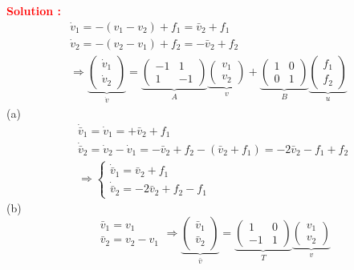 \documentclass[12pt]{article}
\begin{document}
\textbf{\textcolor{red}{Solution :}} \\
$$
\begin{aligned}
\dot{v}_1=-\left(v_1-v_2\right)+f_1=\bar{v}_2+f_1 \\
\dot{v}_2=-\left(v_2-v_1\right)+f_2=-\bar{v}_2+f_2 \\
\Longrightarrow \underbrace{\left(\begin{array}{c}
\dot{v}_1 \\
\dot{v}_2
\end{array}\right)}_{\dot{v}}=\underbrace{\left(\begin{array}{cc}
-1 & 1 \\
1 & -1
\end{array}\right)}_A \underbrace{\left(\begin{array}{l}
v_1 \\
v_2
\end{array}\right)}_v+\underbrace{\left(\begin{array}{cc}
1 & 0 \\
0 & 1
\end{array}\right)}_B \underbrace{\left(\begin{array}{l}
f_1 \\
f_2
\end{array}\right)}_u
\end{aligned}
$$
(a)
$$
\begin{aligned}
& \dot{\bar{v}}_1=\dot{v}_1=+\bar{v}_2+f_1 \\
& \dot{\bar{v}}_2=\dot{v}_2-\dot{v}_1=-\bar{v}_2+f_2-\left(\bar{v}_2+f_1\right)=-2 \bar{v}_2-f_1+f_2 \\
& \Longrightarrow\left\{\begin{array}{l}
\dot{\bar{v}}_1=\bar{v}_2+f_1 \\
\dot{\bar{v}}_2=-2 \bar{v}_2+f_2-f_1
\end{array}\right.
\end{aligned}
$$
(b)
$$
\begin{aligned}
& \bar{v}_1=v_1 \\
& \bar{v}_2=v_2-v_1
\end{aligned} \Longrightarrow \underbrace{\left(\begin{array}{l}
\bar{v}_1 \\
\bar{v}_2
\end{array}\right)}_{\bar{v}}=\underbrace{\left(\begin{array}{cc}
1 & 0 \\
-1 & 1
\end{array}\right)}_T \underbrace{\left(\begin{array}{l}
v_1 \\
v_2
\end{array}\right)}_v
$$
\end{document}
